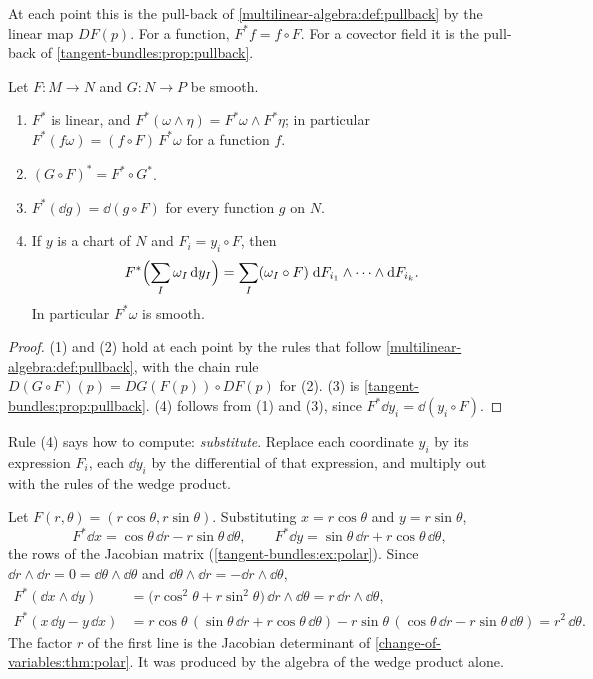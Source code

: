 \begin{notechapter}
At each point this is the pull-back of
\cref{multilinear-algebra:def:pullback} by the linear map $DF(p)$. For a
function, $F^*f = f\circ F$. For a covector field it is the pull-back of
\cref{tangent-bundles:prop:pullback}.

\begin{proposition}
\label{differential-forms:prop:pullback}
Let $F:M\to N$ and $G:N\to P$ be smooth.
\begin{enumerate}[nosep]
  \item $F^*$ is linear, and
        $F^*(\omega\wedge\eta) = F^*\omega\wedge F^*\eta$; in particular
        $F^*(f\omega) = (f\circ F)\,F^*\omega$ for a function $f$.
  \item $(G\circ F)^* = F^*\circ G^*$.
  \item $F^*(\dd g) = \dd(g\circ F)$ for every function $g$ on $N$.
  \item If $y$ is a chart of $N$ and $F_i = y_i\circ F$, then
        \[
          F^*\Bigl(\sum_I\omega_I\,\mathrm{d} y_I\Bigr)
          = \sum_I(\omega_I\circ F)\;
            \mathrm{d} F_{i_1}\wedge\dots\wedge\mathrm{d} F_{i_k} .
        \]
        In particular $F^*\omega$ is smooth.
\end{enumerate}
\end{proposition}

\begin{proof}
(1) and (2) hold at each point by the rules that follow
\cref{multilinear-algebra:def:pullback}, with the chain rule
$D(G\circ F)(p) = DG(F(p))\circ DF(p)$ for (2). (3) is
\cref{tangent-bundles:prop:pullback}. (4) follows from (1) and (3),
since $F^*\dd y_i = \dd(y_i\circ F)$.
\end{proof}

Rule (4) says how to compute: \emph{substitute}. Replace each coordinate
$y_i$ by its expression $F_i$, each $\dd y_i$ by the differential of
that expression, and multiply out with the rules of the wedge product.

\begin{example}\label{differential-forms:ex:polar}
Let $F(r, \theta) = (r\cos\theta, r\sin\theta)$. Substituting
$x = r\cos\theta$ and $y = r\sin\theta$,
\[
  F^*\dd x = \cos\theta\,\dd r - r\sin\theta\,\dd\theta ,
  \qquad
  F^*\dd y = \sin\theta\,\dd r + r\cos\theta\,\dd\theta ,
\]
the rows of the Jacobian matrix (\cref{tangent-bundles:ex:polar}).
Since $\dd r\wedge\dd r = 0 = \dd\theta\wedge\dd\theta$ and
$\dd\theta\wedge\dd r = -\dd r\wedge\dd\theta$,
\begin{align*}
  F^*(\dd x\wedge\dd y)
  &= \bigl(r\cos^2\theta + r\sin^2\theta\bigr)\,\dd r\wedge\dd\theta
   = r\,\dd r\wedge\dd\theta , \\
  F^*(x\,\dd y - y\,\dd x)
  &= r\cos\theta\,(\sin\theta\,\dd r + r\cos\theta\,\dd\theta)
   - r\sin\theta\,(\cos\theta\,\dd r - r\sin\theta\,\dd\theta)
   = r^2\,\dd\theta .
\end{align*}
The factor $r$ of the first line is the Jacobian determinant of
\cref{change-of-variables:thm:polar}. It was produced by the algebra of
the wedge product alone.
\end{example}


\end{notechapter}
